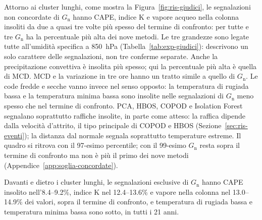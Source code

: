 Attorno ai cluster lunghi, come mostra la Figura~\ref{fig:ris-giudici}, le segnalazioni non concordate di $G_{\mathrm{n}}$ hanno CAPE, indice K e vapore acqueo nella colonna insoliti da due a quasi tre volte più spesso del termine di confronto: per tutte e tre $G_{\mathrm{n}}$ ha la percentuale più alta dei nove metodi. Le tre grandezze sono legate tutte all'umidità specifica a 850~hPa (Tabella~\ref{tab:exp-giudici}): descrivono un solo carattere delle segnalazioni, non tre conferme separate. Anche la precipitazione convettiva è insolita più spesso; qui la percentuale più alta è quella di MCD. MCD e la variazione in tre ore hanno un tratto simile a quello di $G_{\mathrm{n}}$. Le code fredde e secche vanno invece nel senso opposto: la temperatura di rugiada bassa e la temperatura minima bassa sono insolite nelle segnalazioni di $G_{\mathrm{n}}$ meno spesso che nel termine di confronto. PCA, HBOS, COPOD e Isolation Forest segnalano soprattutto raffiche insolite, in parte come atteso: la raffica dipende dalla velocità d'attrito, il tipo principale di COPOD e HBOS (Sezione~\ref{sec:ris-eventi}); la distanza dal normale segnala soprattutto temperature estreme. Il quadro si ritrova con il 97-esimo percentile; con il 99-esimo $G_{\mathrm{n}}$ resta sopra il termine di confronto ma non è più il primo dei nove metodi (Appendice~\ref{app:soglia-concordate}).

Davanti e dietro i cluster lunghi, le segnalazioni esclusive di $G_{\mathrm{n}}$ hanno CAPE insolito nell'8.4--9.2\%, indice K nel 12.4--13.6\% e vapore nella colonna nel 13.0--14.9\% dei valori, sopra il termine di confronto, e temperatura di rugiada bassa e temperatura minima bassa sono sotto, in tutti i 21 anni.

